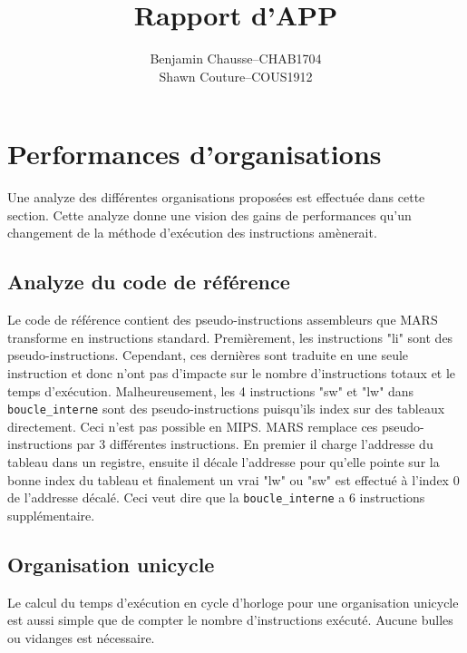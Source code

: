 \documentclass[a11paper]{article}
\title{Rapport d'APP}
\author{
  \addtolength{\tabcolsep}{-0.4em}
  \begin{tabular}{rcl} %
      Benjamin Chausse & -- & CHAB1704 \\
      Shawn Couture    & -- & COUS1912 \\
  \end{tabular}
}
\newcommand{\todo}[1]{\begin{color}{Red}\textbf{TODO:} #1\end{color}}
\begin{document}
\maketitle
\newpage
\tableofcontents
\newpage
{}  %
\setcounter{page}{1}    %

\section{Performances d'organisations}
Une analyze des différentes organisations proposées est effectuée dans cette
section. Cette analyze donne une vision des gains de performances qu'un
changement de la méthode d'exécution des instructions amènerait.

\subsection{Analyze du code de référence}

Le code de référence contient des pseudo-instructions assembleurs que MARS
transforme en instructions standard. Premièrement, les instructions "li" sont
des pseudo-instructions. Cependant, ces dernières sont traduite en une seule
instruction et donc n'ont pas d'impacte sur le nombre d'instructions totaux
et le temps d'exécution. Malheureusement, les 4 instructions "sw" et "lw"
dans \verb|boucle_interne| sont des pseudo-instructions puisqu'ils index sur
des tableaux directement. Ceci n'est pas possible en MIPS. MARS remplace ces
pseudo-instructions par 3 différentes instructions. En premier il charge
l'addresse du tableau dans un registre, ensuite il décale l'addresse pour
qu'elle pointe sur la bonne index du tableau et finalement un vrai "lw" ou
"sw" est effectué à l'index 0 de l'addresse décalé. Ceci veut dire que la
\verb|boucle_interne| a 6 instructions supplémentaire.

\subsection{Organisation unicycle}


Le calcul du temps d'exécution en cycle d'horloge pour une organisation
unicycle est aussi simple que de compter le nombre d'instructions exécuté.
Aucune bulles ou vidanges est nécessaire.
\end{document}
